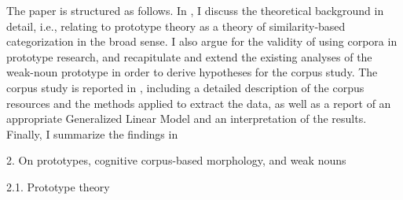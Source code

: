 \begin{styleMoutonText}
The paper is structured as follows. In , I discuss the theoretical background in detail, i.e., relating to prototype theory as a theory of similarity-based categorization in the broad sense. I also argue for the validity of using corpora in prototype research, and recapitulate and extend the existing analyses of the weak-noun prototype in order to derive hypotheses for the corpus study. The corpus study is reported in , including a detailed description of the corpus resources and the methods applied to extract the data, as well as a report of an appropriate Generalized Linear Model and an interpretation of the results. Finally, I summarize the findings in 
\end{styleMoutonText}

\begin{styleMoutonHeadingi}
2. On prototypes, cognitive corpus-based morphology, and weak nouns
\end{styleMoutonHeadingi}

\begin{styleMoutonHeadingii}
2.1. Prototype theory
\end{styleMoutonHeadingii}

